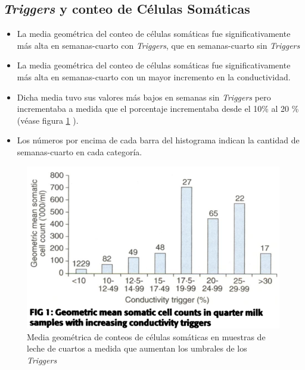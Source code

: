 \documentclass[a4paper, 11pt]{article}
\begin{document}
\subsection{\emph{Triggers} y conteo de Células Somáticas}
\begin{itemize}
	\item La media geométrica del conteo de células somáticas fue significativamente más alta en semanas-cuarto con \emph{Triggers}, que en semanas-cuarto sin \emph{Triggers}
	\item La media geométrica del conteo de células somáticas fue significativamente más alta en semanas-cuarto con un mayor incremento en la conductividad.
	\item Dicha media tuvo sus valores más bajos en semanas sin \emph{Triggers} pero incrementaba a medida que el porcentaje incrementaba desde el 10\% al 20 \% (véase figura \ref{fig:Geomean} ).
	\item Los números por encima de cada barra del histograma indican la cantidad de semanas-cuarto en cada categoría.
\end{itemize}
\begin{figure}[H]
	\centering
	\includegraphics[width=0.7\linewidth]{img/Geomean}
	\caption{Media geométrica de conteos de células somáticas en muestras de leche de cuartos a medida que aumentan los umbrales de los \emph{Triggers}  \label{fig:Geomean}}
\end{figure}
\end{document}
